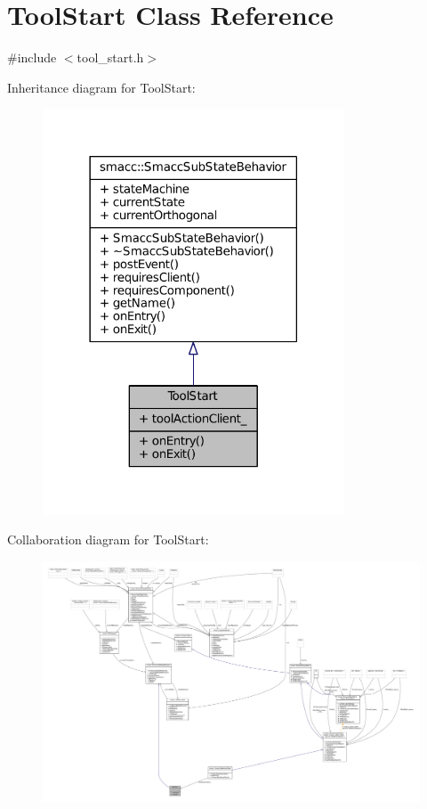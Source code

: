 \hypertarget{classToolStart}{}\section{Tool\+Start Class Reference}
\label{classToolStart}


{\ttfamily \#include $<$tool\+\_\+start.\+h$>$}



Inheritance diagram for Tool\+Start\+:
\nopagebreak
\begin{figure}[H]
\begin{center}
\leavevmode
\includegraphics[width=254pt]{classToolStart__inherit__graph}
\end{center}
\end{figure}


Collaboration diagram for Tool\+Start\+:
\nopagebreak
\begin{figure}[H]
\begin{center}
\leavevmode
\includegraphics[width=350pt]{classToolStart__coll__graph}
\end{center}
\end{figure}
